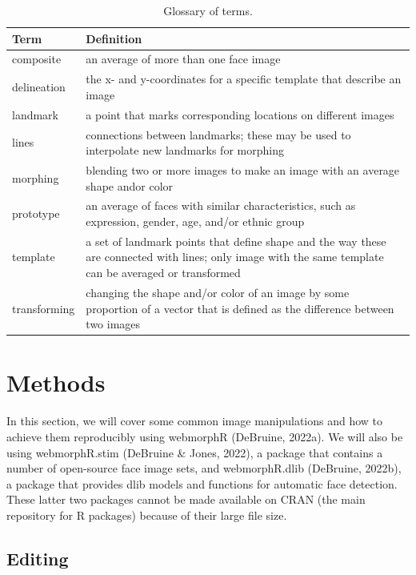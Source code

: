 \documentclass[
  doc,floatsintext]{apa6}
\begin{document}
\begin{table}

\caption{\label{tab:glossary}Glossary of terms.}
\centering
\begin{tabular}[t]{l|l}
\hline
Term & Definition\\
\hline
composite & an average of more than one face image\\
\hline
delineation & the x- and y-coordinates for a specific template that describe an image\\
\hline
landmark & a point that marks corresponding locations on different images\\
\hline
lines & connections between landmarks; these may be used to interpolate new landmarks for morphing\\
\hline
morphing & blending two or more images to make an image with an average shape andor color\\
\hline
prototype & an average of faces with similar characteristics, such as expression, gender, age, and/or ethnic group\\
\hline
template & a set of landmark points that define shape and the way these are connected with lines; only image with the same template can be averaged or transformed\\
\hline
transforming & changing the shape and/or color of an image by some proportion of a vector that is  defined as the difference between two images\\
\hline
\end{tabular}
\end{table}

\hypertarget{methods}{%
\section{Methods}\label{methods}}

In this section, we will cover some common image manipulations and how to achieve them reproducibly using webmorphR (DeBruine, 2022a). We will also be using webmorphR.stim (DeBruine \& Jones, 2022), a package that contains a number of open-source face image sets, and webmorphR.dlib (DeBruine, 2022b), a package that provides dlib models and functions for automatic face detection. These latter two packages cannot be made available on CRAN (the main repository for R packages) because of their large file size.

\hypertarget{editing}{%
\subsection{Editing}\label{editing}}
\end{document}
